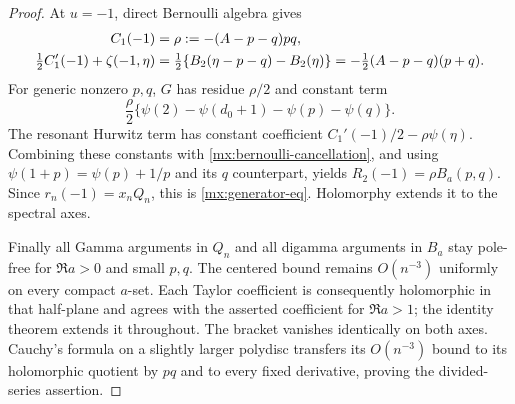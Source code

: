 \begin{proof}
At $u=-1$, direct Bernoulli algebra gives
\begin{align}
 C_1(-1)&=\rho:=-(A-p-q)pq,\notag\\
 \tfrac12 C_1'(-1)+\zeta(-1,\eta)
 &=\tfrac12\{B_2(\eta-p-q)-B_2(\eta)\}
 =-\tfrac12(A-p-q)(p+q).
 \label{mx:bernoulli-cancellation}
\end{align}
For generic nonzero $p,q$, $G$ has residue $\rho/2$ and constant term
\[
 \frac\rho2\{\psi(2)-\psi(d_0+1)-\psi(p)-\psi(q)\}.
\]
The resonant Hurwitz term has constant coefficient
$C_1'(-1)/2-\rho\psi(\eta)$. Combining these constants with
\eqref{mx:bernoulli-cancellation}, and using
$\psi(1+p)=\psi(p)+1/p$ and its $q$ counterpart, yields
$R_2(-1)=\rho B_a(p,q)$. Since $r_n(-1)=x_nQ_n$, this is
\eqref{mx:generator-eq}. Holomorphy extends it to the spectral axes.

Finally all Gamma arguments in $Q_n$ and all digamma arguments in
$B_a$ stay pole-free for $\Re a>0$ and small $p,q$. The centered
bound remains $O(n^{-3})$ uniformly on every compact $a$-set.
Each Taylor coefficient is consequently holomorphic in that half-plane
and agrees with the asserted coefficient for $\Re a>1$; the identity
theorem extends it throughout. The bracket vanishes identically on
both axes. Cauchy's formula on a slightly larger polydisc transfers
its $O(n^{-3})$ bound to its holomorphic quotient by $pq$ and to
every fixed derivative, proving the divided-series assertion.
\end{proof}

